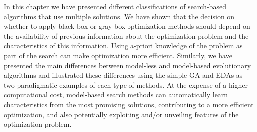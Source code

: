 In this chapter we have presented different classifications of search-based algorithms that use multiple solutions.  We have shown that the decision on whether to apply  black-box or gray-box optimization methods  should depend on the availability of previous information about the optimization problem and the characteristics of this information. Using a-priori knowledge of the problem as part of the search can make optimization more efficient. Similarly, we have presented the main differences between model-less and model-based evolutionary algorithms and illustrated these differences using the simple GA and EDAs as two paradigmatic examples of each type of methods. At the expense of a higher computational cost, model-based search methods can automatically learn characteristics from the most promising solutions, contributing to a more  efficient optimization, and also potentially exploiting and/or unveiling features of the optimization problem. 

 
 




